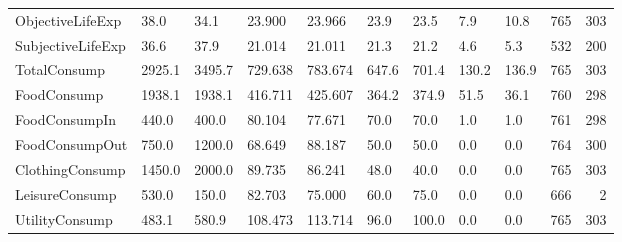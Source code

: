 \begin{table}
\begin{tabular}[t]{lllllllllrr}
\addlinespace
ObjectiveLifeExp & 38.0 & 34.1 & 23.900 & 23.966 & 23.9 & 23.5 & 7.9 & 10.8 & 765 & 303\\
SubjectiveLifeExp & 36.6 & 37.9 & 21.014 & 21.011 & 21.3 & 21.2 & 4.6 & 5.3 & 532 & 200\\
TotalConsump & 2925.1 & 3495.7 & 729.638 & 783.674 & 647.6 & 701.4 & 130.2 & 136.9 & 765 & 303\\
FoodConsump & 1938.1 & 1938.1 & 416.711 & 425.607 & 364.2 & 374.9 & 51.5 & 36.1 & 760 & 298\\
FoodConsumpIn & 440.0 & 400.0 & 80.104 & 77.671 & 70.0 & 70.0 & 1.0 & 1.0 & 761 & 298\\
\addlinespace
FoodConsumpOut & 750.0 & 1200.0 & 68.649 & 88.187 & 50.0 & 50.0 & 0.0 & 0.0 & 764 & 300\\
ClothingConsump & 1450.0 & 2000.0 & 89.735 & 86.241 & 48.0 & 40.0 & 0.0 & 0.0 & 765 & 303\\
LeisureConsump & 530.0 & 150.0 & 82.703 & 75.000 & 60.0 & 75.0 & 0.0 & 0.0 & 666 & 2\\
UtilityConsump & 483.1 & 580.9 & 108.473 & 113.714 & 96.0 & 100.0 & 0.0 & 0.0 & 765 & 303\\
\bottomrule
\end{tabular}
\end{table}
